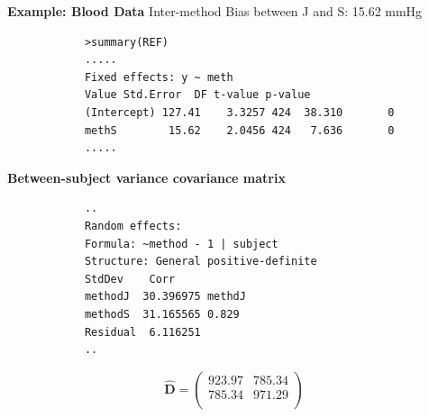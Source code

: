 \documentclass[compress]{beamer}        %
\makeatletter
\newcommand{\tcb}{\textcolor{beamer@blendedblue}}
\makeatother
\begin{document}
		\begin{frame}[fragile]{\bf \tcb{Example: Blood Data}}
			Inter-method Bias between J and S:         15.62 mmHg
			\begin{verbatim}
			>summary(REF)
			.....
			Fixed effects: y ~ meth
			Value Std.Error  DF t-value p-value
			(Intercept) 127.41    3.3257 424  38.310       0
			methS        15.62    2.0456 424   7.636       0
			.....
			\end{verbatim}
		\end{frame}
		
		\begin{frame}[fragile]{\bf \tcb{Between-subject variance covariance matrix }}
			
			\begin{verbatim}
			..
			Random effects:
			Formula: ~method - 1 | subject
			Structure: General positive-definite
			StdDev    Corr
			methodJ  30.396975 methdJ
			methodS  31.165565 0.829
			Residual  6.116251
			..
			\end{verbatim}
			\[
			\hat{\boldsymbol{D}} = \left(
			\begin{array}{cc}
			923.97	& 785.34 \\
			785.34	& 971.29\\
			\end{array}\right)
			\]
		\end{frame}
		
\end{document}
